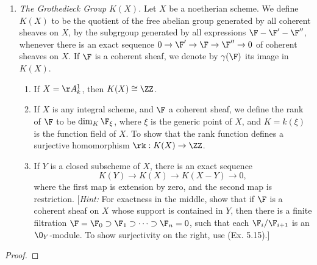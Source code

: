 \documentclass[12pt]{amsart}
\begin{document}
\begin{enumerate}
  \item[6.10] {
      \emph{The Grothedieck Group $K(X)$.}
      Let $X$ be a noetherian scheme.
      We define $K(X)$ to be the quotient of the free abelian group generated by all coherent sheaves on $X$, by the subgrgoup generated by all expressions $\F-\F'-\F''$, whenever there is an exact sequence $0\to \F'\to\F\to\F''\to 0$ of coherent sheaves on $X$.
      If $\F$ is a coherent sheaf, we denote by $\gamma(\F)$ its image in $K(X)$.
      \begin{enumerate}
        \item If $X=\AA_k^1$, then $K(X)\cong \ZZ$.
        \item If $X$ is any integral scheme, and $\F$ a coherent sheaf, we define the rank of $\F$ to be $\dim_K\F_\xi$, where $\xi$ is the generic point of $X$, and $K=k(\xi)$ is the function field of $X$.
          To show that the rank function defines a surjective homomorphism $\rk:K(X)\to \ZZ$.
        \item If $Y$ is a closed subscheme of $X$, there is an exact sequence
          \[
            K(Y)\to K(X)\to K(X-Y)\to 0,
          \] 
          where the first map is extension by zero, and the second map is restriction.
          [\emph{Hint:} For exactness in the middle, show that if $\F$ is a coherent sheaf on $X$ whose support is contained in $Y$, then there is a finite filtration $\F=\F_0\supset \F_1\supset\cdots\supset \F_n=0$, such that each $\F_i/\F_{i+1}$ is an $\O_Y$-module.
          To show surjectivity on the right, use (Ex. 5.15).]
      \end{enumerate}
    }
\end{enumerate}

\begin{proof}
  
\end{proof}
\end{document}
